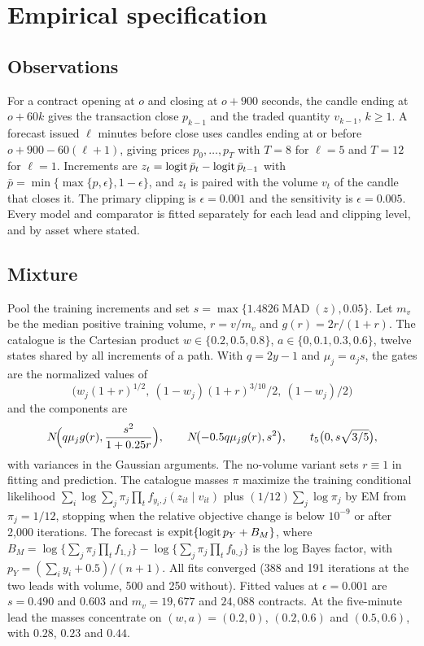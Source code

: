 \section{Empirical specification}
\label{app:empirical}
\subsection{Observations}
For a contract opening at $o$ and closing at $o+900$ seconds, the candle ending at $o+60k$ gives the transaction close $p_{k-1}$ and the traded quantity $v_{k-1}$, $k\geq1$. A forecast issued $\ell$ minutes before close uses candles ending at or before $o+900-60(\ell+1)$, giving prices $p_0,\ldots,p_T$ with $T=8$ for $\ell=5$ and $T=12$ for $\ell=1$. Increments are $z_t=\operatorname{logit}\bar p_t-\operatorname{logit}\bar p_{t-1}$ with $\bar p=\min\{\max\{p,\epsilon\},1-\epsilon\}$, and $z_t$ is paired with the volume $v_t$ of the candle that closes it. The primary clipping is $\epsilon=0.001$ and the sensitivity is $\epsilon=0.005$. Every model and comparator is fitted separately for each lead and clipping level, and by asset where stated.

\subsection{Mixture}
Pool the training increments and set $s=\max\{1.4826\operatorname{MAD}(z),0.05\}$. Let $m_v$ be the median positive training volume, $r=v/m_v$ and $g(r)=2r/(1+r)$. The catalogue is the Cartesian product $w\in\{0.2,0.5,0.8\}$, $a\in\{0,0.1,0.3,0.6\}$, twelve states shared by all increments of a path. With $q=2y-1$ and $\mu_j=a_js$, the gates are the normalized values of
\[
 \bigl(w_j(1+r)^{1/2},\ (1-w_j)(1+r)^{3/10}/2,\ (1-w_j)/2\bigr)
\]
and the components are
\[
 N\!\Bigl(q\mu_jg(r),\frac{s^2}{1+0.25r}\Bigr),\qquad N\!\bigl(-0.5q\mu_jg(r),s^2\bigr),\qquad t_5\bigl(0,s\sqrt{3/5}\bigr),
\]
with variances in the Gaussian arguments. The no-volume variant sets $r\equiv1$ in fitting and prediction. The catalogue masses $\pi$ maximize the training conditional likelihood $\sum_i\log\sum_j\pi_j\prod_tf_{y_i,j}(z_{it}\mid v_{it})$ plus $(1/12)\sum_j\log\pi_j$ by EM from $\pi_j=1/12$, stopping when the relative objective change is below $10^{-9}$ or after 2,000 iterations. The forecast is $\operatorname{expit}\{\operatorname{logit} p_Y+B_M\}$, where $B_M=\log\{\sum_j\pi_j\prod_tf_{1,j}\}-\log\{\sum_j\pi_j\prod_tf_{0,j}\}$ is the log Bayes factor, with $p_Y=(\sum_iy_i+0.5)/(n+1)$. All fits converged (388 and 191 iterations at the two leads with volume, 500 and 250 without). Fitted values at $\epsilon=0.001$ are $s=0.490$ and $0.603$ and $m_v=19{,}677$ and $24{,}088$ contracts. At the five-minute lead the masses concentrate on $(w,a)=(0.2,0)$, $(0.2,0.6)$ and $(0.5,0.6)$, with $0.28$, $0.23$ and $0.44$.


